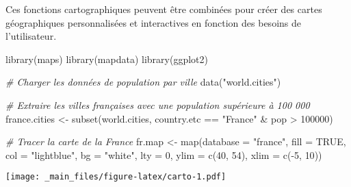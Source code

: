 \documentclass[
]{article}
\newenvironment{Shaded}{\begin{snugshade}}{\end{snugshade}}
\newcommand{\AttributeTok}[1]{\textcolor[rgb]{0.77,0.63,0.00}{#1}}
\newcommand{\CommentTok}[1]{\textcolor[rgb]{0.56,0.35,0.01}{\textit{#1}}}
\newcommand{\ConstantTok}[1]{\textcolor[rgb]{0.00,0.00,0.00}{#1}}
\newcommand{\DecValTok}[1]{\textcolor[rgb]{0.00,0.00,0.81}{#1}}
\newcommand{\FunctionTok}[1]{\textcolor[rgb]{0.00,0.00,0.00}{#1}}
\newcommand{\NormalTok}[1]{#1}
\newcommand{\OtherTok}[1]{\textcolor[rgb]{0.56,0.35,0.01}{#1}}
\newcommand{\SpecialCharTok}[1]{\textcolor[rgb]{0.00,0.00,0.00}{#1}}
\newcommand{\StringTok}[1]{\textcolor[rgb]{0.31,0.60,0.02}{#1}}
\begin{document}
Ces fonctions cartographiques peuvent être combinées pour créer des cartes géographiques personnalisées et interactives en fonction des besoins de l'utilisateur.

\begin{Shaded}
\begin{Highlighting}[]
\FunctionTok{library}\NormalTok{(maps)}
\FunctionTok{library}\NormalTok{(mapdata)}
\FunctionTok{library}\NormalTok{(ggplot2)}

\CommentTok{\# Charger les données de population par ville}
\FunctionTok{data}\NormalTok{(}\StringTok{"world.cities"}\NormalTok{)}

\CommentTok{\# Extraire les villes françaises avec une population supérieure à 100 000}
\NormalTok{france.cities }\OtherTok{\textless{}{-}} \FunctionTok{subset}\NormalTok{(world.cities, country.etc }\SpecialCharTok{==} \StringTok{"France"} \SpecialCharTok{\&}\NormalTok{ pop }\SpecialCharTok{\textgreater{}} \DecValTok{100000}\NormalTok{)}

\CommentTok{\# Tracer la carte de la France}
\NormalTok{fr.map }\OtherTok{\textless{}{-}} \FunctionTok{map}\NormalTok{(}\AttributeTok{database =} \StringTok{"france"}\NormalTok{, }\AttributeTok{fill =} \ConstantTok{TRUE}\NormalTok{, }\AttributeTok{col =} \StringTok{"lightblue"}\NormalTok{, }\AttributeTok{bg =} \StringTok{"white"}\NormalTok{, }\AttributeTok{lty =} \DecValTok{0}\NormalTok{,}
    \AttributeTok{ylim =} \FunctionTok{c}\NormalTok{(}\DecValTok{40}\NormalTok{, }\DecValTok{54}\NormalTok{), }\AttributeTok{xlim =} \FunctionTok{c}\NormalTok{(}\SpecialCharTok{{-}}\DecValTok{5}\NormalTok{, }\DecValTok{10}\NormalTok{))}
\end{Highlighting}
\end{Shaded}

\texttt{[image: \_main\_files/figure-latex/carto-1.pdf]}
\end{document}
